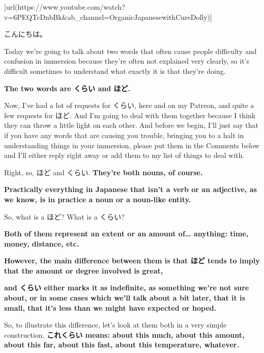 \startsectionlevel[title={{\bf 94. くらい VS ほど}},reference={くらい-vs-ほど}]

[url(https://www.youtube.com/watch?v=6PEQTcDnbBk&ab_channel=OrganicJapanesewithCureDolly)]

こんにちは。

Today we're going to talk about two words that often cause people difficulty and confusion in immersion because they're often not explained very clearly, so it's difficult sometimes to understand what exactly it is that they're doing.

{\bf The two words are くらい and ほど.}

{}

Now, I've had a lot of requests for くらい, here and on my Patreon, and quite a few requests for ほど. And I'm going to deal with them together because I think they can throw a little light on each other. And before we begin, I'll just say that if you have any words that are causing you trouble, bringing you to a halt in understanding things in your immersion, please put them in the Comments below and I'll either reply right away or add them to my list of things to deal with.

\thinrule

Right, so, ほど and くらい. {\bf They're both nouns, of course.}

{\bf Practically everything in Japanese that isn't a verb or an adjective, as we know, is in practice a noun or a noun-like entity.}

So, what is a ほど? What is a くらい?

{\bf Both of them represent an extent or an amount of\ldots{} anything: time, money, distance, etc.}

{}

{\bf However, the main difference between them is that ほど tends to imply that the amount or degree involved is great,}

\thinrule

{\bf and くらい either marks it as indefinite, as something we're not sure about, or in some cases which we'll talk about a bit later, that it is small, that it's less than we might have expected or hoped.}

So, to illustrate this difference, let's look at them both in a very simple construction. {\bf これくらい means: about this much, about this amount, about this far, about this fast,\crlf
about this temperature, whatever.}


